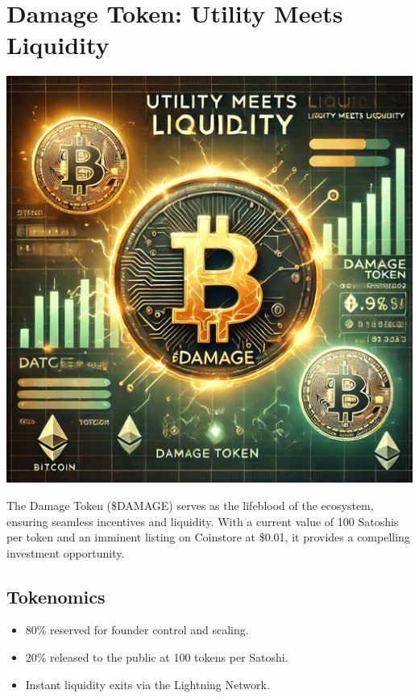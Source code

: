 \documentclass[12pt,a4paper]{article}
\begin{document}
\section{Damage Token: Utility Meets Liquidity}
\includegraphics[width=\textwidth]{compressed/token_liquidity.png} %
\begin{multicols}{2}
The Damage Token (\$DAMAGE) serves as the lifeblood of the ecosystem, ensuring seamless incentives and liquidity. With a current value of 100 Satoshis per token and an imminent listing on Coinstore at \$0.01, it provides a compelling investment opportunity.
\end{multicols}

\subsection{Tokenomics}
\begin{itemize}
    \item 80\% reserved for founder control and scaling.
    \item 20\% released to the public at 100 tokens per Satoshi.
    \item Instant liquidity exits via the Lightning Network.
\end{itemize}
\end{document}
